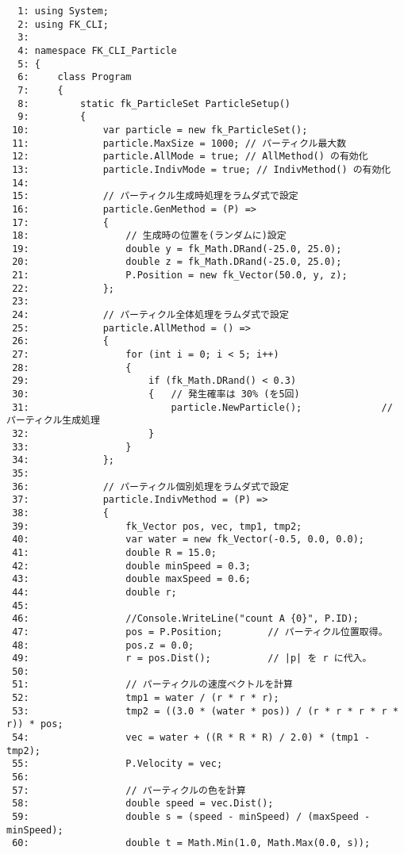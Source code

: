 \begin{breakbox}
\begin{small}
\begin{verbatim}
  1: using System;
  2: using FK_CLI;
  3: 
  4: namespace FK_CLI_Particle
  5: {
  6:     class Program
  7:     {
  8:         static fk_ParticleSet ParticleSetup()
  9:         {
 10:             var particle = new fk_ParticleSet();
 11:             particle.MaxSize = 1000; // パーティクル最大数
 12:             particle.AllMode = true; // AllMethod() の有効化
 13:             particle.IndivMode = true; // IndivMethod() の有効化
 14: 
 15:             // パーティクル生成時処理をラムダ式で設定
 16:             particle.GenMethod = (P) =>
 17:             {
 18:                 // 生成時の位置を(ランダムに)設定
 19:                 double y = fk_Math.DRand(-25.0, 25.0);
 20:                 double z = fk_Math.DRand(-25.0, 25.0);
 21:                 P.Position = new fk_Vector(50.0, y, z);
 22:             };
 23: 
 24:             // パーティクル全体処理をラムダ式で設定
 25:             particle.AllMethod = () =>
 26:             {
 27:                 for (int i = 0; i < 5; i++)
 28:                 {
 29:                     if (fk_Math.DRand() < 0.3)
 30:                     {   // 発生確率は 30% (を5回)
 31:                         particle.NewParticle();              // パーティクル生成処理
 32:                     }
 33:                 }
 34:             };
 35: 
 36:             // パーティクル個別処理をラムダ式で設定
 37:             particle.IndivMethod = (P) =>
 38:             {
 39:                 fk_Vector pos, vec, tmp1, tmp2;
 40:                 var water = new fk_Vector(-0.5, 0.0, 0.0);
 41:                 double R = 15.0;
 42:                 double minSpeed = 0.3;
 43:                 double maxSpeed = 0.6;
 44:                 double r;
 45: 
 46:                 //Console.WriteLine("count A {0}", P.ID);
 47:                 pos = P.Position;        // パーティクル位置取得。
 48:                 pos.z = 0.0;
 49:                 r = pos.Dist();          // |p| を r に代入。
 50: 
 51:                 // パーティクルの速度ベクトルを計算
 52:                 tmp1 = water / (r * r * r);
 53:                 tmp2 = ((3.0 * (water * pos)) / (r * r * r * r * r)) * pos;
 54:                 vec = water + ((R * R * R) / 2.0) * (tmp1 - tmp2);
 55:                 P.Velocity = vec;
 56: 
 57:                 // パーティクルの色を計算
 58:                 double speed = vec.Dist();
 59:                 double s = (speed - minSpeed) / (maxSpeed - minSpeed);
 60:                 double t = Math.Min(1.0, Math.Max(0.0, s));

\end{verbatim}
\end{small}
\end{breakbox}
